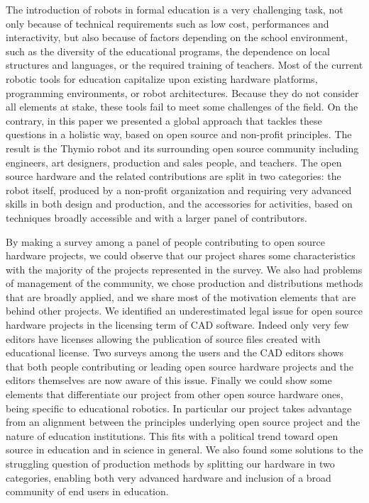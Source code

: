 \documentclass[letterpaper, 10 pt, conference]{ieeeconf}  %
\begin{document}
The introduction of robots in formal education is a very challenging task, not only because of technical requirements such as low cost, performances and interactivity, but also because of factors depending on the school environment, such as the diversity of the educational programs, the dependence on local structures and languages, or the required training of teachers.
Most of the current robotic tools for education capitalize upon existing hardware platforms, programming environments, or robot architectures.
Because they do not consider all elements at stake, these tools fail to meet some challenges of the field.
On the contrary, in this paper we presented a global approach that tackles these questions in a holistic way, based on open source and non-profit principles.
The result is the Thymio robot and its surrounding open source community including engineers, art designers, production and sales people, and teachers.
The open source hardware and the related contributions are split in two categories: the robot itself, produced by a non-profit organization and requiring very advanced skills in both design and production, and the accessories for activities, based on techniques broadly accessible and with a larger panel of contributors.

By making a survey among a panel of people contributing to open source hardware projects, we could observe that our project shares some characteristics with the majority of the projects represented in the survey. 
We also had problems of management of the community, we chose production and distributions methods that are broadly applied, and we share most of the motivation elements that are behind other projects.
We identified an underestimated legal issue for open source hardware projects in the licensing term of CAD software.
Indeed only very few editors have licenses allowing the publication of source files created with educational license.
Two surveys among the users and the CAD editors shows that both people contributing or leading open source hardware projects and the editors themselves are now aware of this issue.
Finally we could show some elements that differentiate our project from other open source hardware ones, being specific to educational robotics.
In particular our project takes advantage from an alignment between the principles underlying open source project and the nature of education institutions. 
This fits with a political trend toward open source in education and in science in general.
We also found some solutions to the struggling question of production methods by splitting our hardware in two categories, enabling both very advanced hardware and inclusion of a broad community of end users in education.
\end{document}
